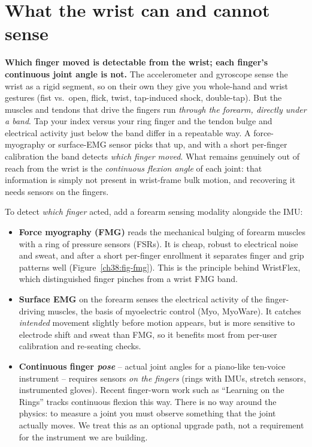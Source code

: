 \section{What the wrist can and cannot sense}
\label{ch38:limits}

\begin{focusbox}
\textbf{Which finger moved is detectable from the wrist; each finger's continuous
joint angle is not.} The accelerometer and gyroscope sense the wrist as a rigid
segment, so on their own they give you whole-hand and wrist gestures (fist vs.\
open, flick, twist, tap-induced shock, double-tap). But the muscles and tendons
that drive the fingers run \emph{through the forearm, directly under a band}. Tap
your index versus your ring finger and the tendon bulge and electrical activity
just below the band differ in a repeatable way. A force-myography or surface-EMG
sensor picks that up, and with a short per-finger calibration the band detects
\emph{which finger moved}. What remains genuinely out of reach from the wrist is
the \emph{continuous flexion angle} of each joint: that information is simply not
present in wrist-frame bulk motion, and recovering it needs sensors on the fingers.
\end{focusbox}

To detect \emph{which finger} acted, add a forearm sensing modality alongside the
IMU:
\begin{itemize}
  \item \textbf{Force myography (FMG)} reads the mechanical bulging of forearm
        muscles with a ring of pressure sensors (FSRs). It is cheap, robust to
        electrical noise and sweat, and after a short per-finger enrollment it
        separates finger and grip patterns well (Figure~\ref{ch38:fig-fmg}). This
        is the principle behind WristFlex, which distinguished finger pinches from a
        wrist FMG band.
  \item \textbf{Surface EMG} on the forearm senses the electrical activity of the
        finger-driving muscles, the basis of myoelectric control (Myo, MyoWare).
        It catches \emph{intended} movement slightly before motion appears, but is
        more sensitive to electrode shift and sweat than FMG, so it benefits most
        from per-user calibration and re-seating checks.
  \item \textbf{Continuous finger \emph{pose}} -- actual joint angles for a piano-like
        ten-voice instrument -- requires sensors \emph{on the fingers} (rings with
        IMUs, stretch sensors, instrumented gloves). Recent finger-worn work such
        as ``Learning on the Rings'' tracks continuous flexion this way. There is no
        way around the physics: to measure a joint you must observe something that
        the joint actually moves. We treat this as an optional upgrade path, not a
        requirement for the instrument we are building.
\end{itemize}

